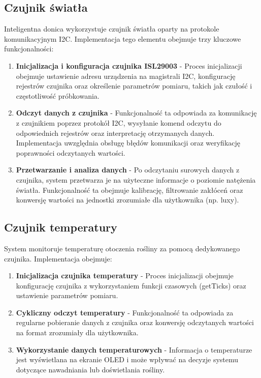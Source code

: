 \documentclass{article}
\begin{document}
\subsection{Czujnik światła}
\label{sec:czujnik_swiatla}
Inteligentna donica wykorzystuje czujnik światła oparty na protokole komunikacyjnym I2C. Implementacja tego elementu obejmuje trzy kluczowe funkcjonalności:

\begin{enumerate}
    \item \textbf{Inicjalizacja i konfiguracja czujnika ISL29003} - Proces inicjalizacji obejmuje ustawienie adresu urządzenia na magistrali I2C, konfigurację rejestrów czujnika oraz określenie parametrów pomiaru, takich jak czułość i częstotliwość próbkowania.

    \item \textbf{Odczyt danych z czujnika} - Funkcjonalność ta odpowiada za komunikację z czujnikiem poprzez protokół I2C, wysyłanie komend odczytu do odpowiednich rejestrów oraz interpretację otrzymanych danych. Implementacja uwzględnia obsługę błędów komunikacji oraz weryfikację poprawności odczytanych wartości.

    \item \textbf{Przetwarzanie i analiza danych} - Po odczytaniu surowych danych z czujnika, system przetwarza je na użyteczne informacje o poziomie natężenia światła. Funkcjonalność ta obejmuje kalibrację, filtrowanie zakłóceń oraz konwersję wartości na jednostki zrozumiałe dla użytkownika (np. luxy).
\end{enumerate}






\subsection{Czujnik temperatury}
System monitoruje temperaturę otoczenia rośliny za pomocą dedykowanego czujnika. Implementacja obejmuje:

\begin{enumerate}
    \item \textbf{Inicjalizacja czujnika temperatury} - Proces inicjalizacji obejmuje konfigurację czujnika z wykorzystaniem funkcji czasowych (getTicks) oraz ustawienie parametrów pomiaru.
    
    \item \textbf{Cykliczny odczyt temperatury} - Funkcjonalność ta odpowiada za regularne pobieranie danych z czujnika oraz konwersję odczytanych wartości na format zrozumiały dla użytkownika.
    
    \item \textbf{Wykorzystanie danych temperaturowych} - Informacja o temperaturze jest wyświetlana na ekranie OLED i może wpływać na decyzje systemu dotyczące nawadniania lub doświetlania rośliny.
\end{enumerate}
\end{document}
